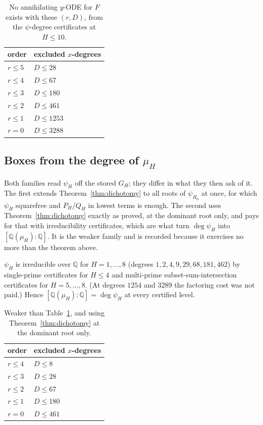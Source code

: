 \documentclass[11pt]{article}
\newcommand{\Q}{\mathbb{Q}}
\begin{document}
\begin{table}[H]
\centering
\begin{tabular}{l l}
\toprule
order & excluded $x$-degrees \\
\midrule
$r \le 5$ & $D \le 28$ \\
$r \le 4$ & $D \le 67$ \\
$r \le 3$ & $D \le 180$ \\
$r \le 2$ & $D \le 461$ \\
$r \le 1$ & $D \le 1253$ \\
$r = 0$   & $D \le 3288$ \\
\bottomrule
\end{tabular}
\caption{No annihilating $y$-ODE for $F$ exists with these $(r,D)$, from the
$\psi$-degree certificates at $H \le 10$.}
\label{tab:psiboxes}
\end{table}

\subsection{Boxes from the degree of \texorpdfstring{$\mu_H$}{mu\_H}}

Both families read $\psi_H$ off the stored $G_H$; they differ in what they then
ask of it. The first extends Theorem~\ref{thm:dichotomy} to all roots of
$\psi_{H_0}$ at once, for which $\psi_H$ squarefree and $P_H/Q_H$ in lowest terms
is enough. The second uses Theorem~\ref{thm:dichotomy} exactly as proved, at the
dominant root only, and pays for that with irreducibility certificates,
which are what turn $\deg\psi_H$ into $[\Q(\mu_H):\Q]$. It is the weaker family
and is recorded because it exercises no more than the theorem above.

$\psi_H$ is irreducible over $\Q$ for $H = 1,\dots,8$ (degrees
$1, 2, 4, 9, 29, 68, 181, 462$) by single-prime certificates for $H \le 4$ and
multi-prime subset-sum-intersection certificates for $H = 5,\dots,8$. (At degrees
$1254$ and $3289$ the factoring cost was not paid.) Hence
$[\Q(\mu_H):\Q] = \deg\psi_H$ at every certified level.

\begin{table}[H]
\centering
\begin{tabular}{l l}
\toprule
order & excluded $x$-degrees \\
\midrule
$r \le 4$ & $D \le 8$ \\
$r \le 3$ & $D \le 28$ \\
$r \le 2$ & $D \le 67$ \\
$r \le 1$ & $D \le 180$ \\
$r = 0$   & $D \le 461$ \\
\bottomrule
\end{tabular}
\caption{Weaker than Table~\ref{tab:psiboxes}, and using
Theorem~\ref{thm:dichotomy} at the dominant root only.}
\label{tab:irrboxes}
\end{table}
\end{document}
